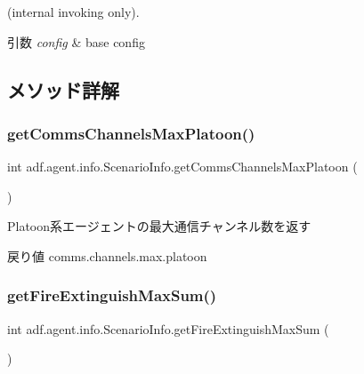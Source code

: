 (internal invoking only). 


\begin{DoxyParams}{引数}
{\em config} & base config \\
\hline
\end{DoxyParams}


\subsection{メソッド詳解}
\hypertarget{classadf_1_1agent_1_1info_1_1ScenarioInfo_a280a7ae14478f58e19d7fc63dd7ce5b0}{}\label{classadf_1_1agent_1_1info_1_1ScenarioInfo_a280a7ae14478f58e19d7fc63dd7ce5b0} 
\subsubsection{\texorpdfstring{get\+Comms\+Channels\+Max\+Platoon()}{getCommsChannelsMaxPlatoon()}}
{\footnotesize\ttfamily int adf.\+agent.\+info.\+Scenario\+Info.\+get\+Comms\+Channels\+Max\+Platoon (\begin{DoxyParamCaption}{ }\end{DoxyParamCaption})}



Platoon系エージェントの最大通信チャンネル数を返す 

\begin{DoxyReturn}{戻り値}
comms.\+channels.\+max.\+platoon 
\end{DoxyReturn}
\hypertarget{classadf_1_1agent_1_1info_1_1ScenarioInfo_a29923a4d0d7f146ed299591638c8a14d}{}\label{classadf_1_1agent_1_1info_1_1ScenarioInfo_a29923a4d0d7f146ed299591638c8a14d} 
\subsubsection{\texorpdfstring{get\+Fire\+Extinguish\+Max\+Sum()}{getFireExtinguishMaxSum()}}
{\footnotesize\ttfamily int adf.\+agent.\+info.\+Scenario\+Info.\+get\+Fire\+Extinguish\+Max\+Sum (\begin{DoxyParamCaption}{ }\end{DoxyParamCaption})}



